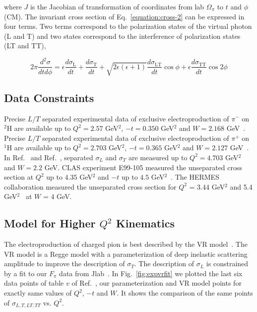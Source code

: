 where $J$ is the Jacobian of transformation of coordinates from lab
$\Omega_{\pi}$ to $t$ and $\phi$ (CM). The invariant cross section of
Eq.~\ref{equation:cross-2} can be expressed in four terms. Two terms correspond
to the polarization states of the virtual photon (L and T) and two states
correspond to the interference of polarization states (LT and TT),

\begin{equation}
  2\pi \frac{d^2 \sigma}{dt d\phi} = \epsilon \frac{d\sigma_{\mathrm{L}}}{dt} +
  \frac{d\sigma_{\mathrm{T}}}{dt} + \sqrt{2\epsilon (\epsilon +1)}
  \frac{d\sigma_{\mathrm{LT}}}{dt} \cos{\phi} + \epsilon
  \frac{d\sigma_{\mathrm{TT}}}{dt} \cos{2 \phi}
  \label{equation:cross-3}
\end{equation}

\subsection{Data Constraints}

Precise $L/T$ separated experimental data of exclusive electroproduction of
$\pi^{-}$ on $^2$H are available up to $Q^2 = 2.57$ GeV$^2$, $-t = 0.350$
GeV$^2$ and $W = 2.168$ GeV~\cite{gmhuber-2}. Precise $L/T$ separated
experimental data of exclusive electroproduction of $\pi^{+}$ on $^1$H are
available up to $Q^2 = 2.703$ GeV$^2$, $-t = 0.365$ GeV$^2$ and $W = 2.127$
GeV~\cite{gmhuber}. In Ref.~\cite{hallc-1} and Ref.~\cite{hallc-2}, separated
$\sigma_{L}$ and $\sigma_{T}$ are measured up to $Q^2 = 4.703$ GeV$^2$ and $W =
2.2$ GeV. CLAS experiment E99-105 measured the unseparated cross section at
$Q^2$ up to $4.35$ GeV$^2$ and $-t$ up to $4.5$ GeV$^2$~\cite{park}.  The
HERMES collaboration measured the unseparated cross section for $Q^2$ = 3.44
GeV$^2$ and 5.4 GeV$^2$~\cite{hermes} at $W$ = 4 GeV.

\subsection{Model for Higher $Q^2$ Kinematics}

The electroproduction of charged pion is best described by the VR
model~\cite{vr}. The VR model is a Regge model with a parameterization of deep
inelastic scattering amplitude to improve the description of $\sigma_{T}$. The
description of $\sigma_{L}$ is constrained by a fit to our $F_{\pi}$ data from
Jlab~\cite{gmhuber}. In Fig.~\ref{fig:expvrfit} we plotted the last six data
points of table $v$ of Ref.~\cite{gmhuber-2}, our parameterization and VR model
points for exactly same values of $Q^2$, $-t$ and $W$. It shows the comparison
of the same points of $\sigma_{L,T,LT,TT}$ vs. $Q^{2}$.

